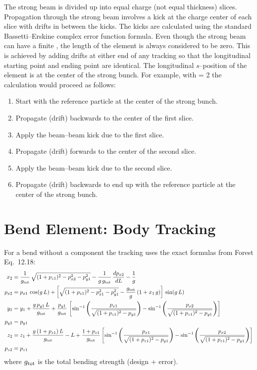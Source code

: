 The strong beam is divided up into  equal charge (not
equal thickness) slices. Propagation through the strong beam involves
a kick at the charge center of each slice with drifts in between the
kicks. The kicks are calculated using the standard Bassetti--Erskine
complex error function formula\cite{b:talman}.  Even though the strong
beam can have a finite , the length of the element is always
considered to be zero. This is achieved by adding drifts at either end
of any tracking so that the longitudinal starting point and ending
point are identical. The longitudinal $s$--position of the
 element is at the center of the strong bunch. For
example, with  = 2 the calculation would proceed as
follows:
\begin{enumerate}
  \item  Start with the reference particle at the center of the strong bunch.
  \item  Propagate (drift) backwards to the center of the first slice.
  \item  Apply the beam--beam kick due to the first slice.
  \item  Propagate (drift) forwards to the center of the second slice.
  \item  Apply the beam--beam kick due to the second slice.
  \item  Propagate (drift) backwards to end up with the reference particle
     at the center of the strong bunch.
\end{enumerate}

\section{Bend Element: Body Tracking}
\label{s:bend.body.std}

For a bend without a  component the tracking uses the exact formulas from
Forest\cite{b:forest} Eq.~12.18:
\begin{align}
  x_2    &= \frac{1}{g_{\text{tot}}} \, \sqrt{ (1 + p_{z1})^2 - p_{x2}^2 - p_{y1}^2} -
    \frac{1}{g \, g_{\text{tot}}} \, \frac{dp_{x2}}{dL} - \frac{1}{g} \nonumber \\
  p_{x2} &= p_{x1} \, \cos(g \, L) + 
    \left[ \sqrt{ (1 + p_{z1})^2 - p_{x1}^2 - p_{y1}^2} - \frac{g_{\text{tot}}}{g} \, (1 + x_1 \, g ) \right] \,
    \sin(g \, L) \nonumber \\
  y_2    &= y_1 + \frac{g \, p_{y1} \, L}{g_{\text{tot}}} +
    \frac{p_{y1}}{g_{\text{tot}}} \, \left[
    \sin^{-1} \left( \frac{p_{x1}}{\sqrt{(1 + p_{z1})^2 - p_{y1}}} \right) -
    \sin^{-1} \left( \frac{p_{x2}}{\sqrt{(1 + p_{z1})^2 - p_{y1}}} \right) \right] \\
  p_{y2} &= p_{y1} \nonumber \\
  z_2    &= z_1 + \frac{g \, (1 + p_{z1}) \, L}{g_{\text{tot}}} - L + \frac{1 + p_{z1}}{g_{\text{tot}}} \left[
    \sin^{-1} \left( \frac{p_{x1}}{\sqrt{(1 + p_{z1})^2 - p_{y1}}} \right) -
    \sin^{-1} \left( \frac{p_{x2}}{\sqrt{(1 + p_{z1})^2 - p_{y1}}} \right) \right] \nonumber \\
  p_{z2} &= p_{z1} \nonumber
\end{align}
where $g_{\text{tot}}$ is the total bending strength (design + error).

